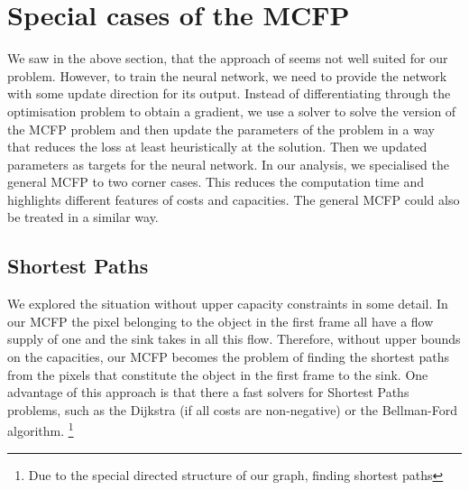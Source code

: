 \documentclass{article}
\begin{document}
\section{Special cases of the MCFP}
We saw in the above section, that the approach of \cite{AmosK17} seems not well suited for our problem. However, to train the neural network, we need to provide the network with some update direction for its output. Instead of differentiating through the optimisation problem to obtain a gradient, we use a solver to solve the version of the MCFP problem and then update the parameters of the problem in a way that reduces the loss at least heuristically at the solution. Then we updated parameters as targets for the neural network. In our analysis, we specialised the general MCFP to two corner cases. This reduces the computation time and highlights different features of costs and capacities. The general MCFP could also be treated in a similar way.


\subsection{Shortest Paths}\label{shortestPaths}
We explored the situation without upper capacity constraints in some detail. In our MCFP the pixel belonging to the object in the first frame all have a flow supply of one and the sink takes in all this flow. Therefore, without upper bounds on the capacities, our MCFP becomes the problem of finding the shortest paths from the pixels that constitute the object in the first frame to the sink. One advantage of this approach is that there a fast solvers for Shortest Paths problems, such as the Dijkstra (if all costs are non-negative) or the Bellman-Ford algorithm.
\footnote{Due to the special directed structure of our graph, finding shortest paths }
\end{document}
